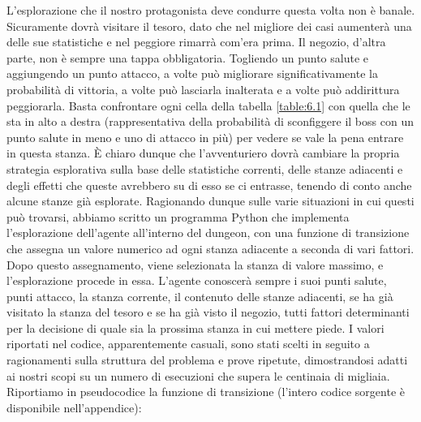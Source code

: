 \documentclass{book}
\theoremstyle{definition}
\theoremstyle{definition}
\theoremstyle{definition}
\theoremstyle{plain}
\theoremstyle{plain}
\theoremstyle{plain}
\theoremstyle{plain}
\begin{document}
L'esplorazione che il nostro protagonista deve condurre questa volta non è banale. Sicuramente dovrà visitare il tesoro, dato che nel migliore dei casi aumenterà una delle sue statistiche e nel peggiore rimarrà com'era prima. Il negozio, d'altra parte, non è sempre una tappa obbligatoria. Togliendo un punto salute e aggiungendo un punto attacco, a volte può migliorare significativamente la probabilità di vittoria, a volte può lasciarla inalterata e a volte può addirittura peggiorarla. Basta confrontare ogni cella della tabella \ref{table:6.1} con quella che le sta in alto a destra (rappresentativa della probabilità di sconfiggere il boss con un punto salute in meno e uno di attacco in più) per vedere se vale la pena entrare in questa stanza. È chiaro dunque che l'avventuriero dovrà cambiare la propria strategia esplorativa sulla base delle statistiche correnti, delle stanze adiacenti e degli effetti che queste avrebbero su di esso se ci entrasse, tenendo di conto anche alcune stanze già esplorate. Ragionando dunque sulle varie situazioni in cui questi può trovarsi, abbiamo scritto un programma Python che implementa l'esplorazione dell'agente all'interno del dungeon, con una funzione di transizione che assegna un valore numerico ad ogni stanza adiacente a seconda di vari fattori. Dopo questo assegnamento, viene selezionata la stanza di valore massimo, e l'esplorazione procede in essa. L'agente conoscerà sempre i suoi punti salute, punti attacco, la stanza corrente, il contenuto delle stanze adiacenti, se ha già visitato la stanza del tesoro e se ha già visto il negozio, tutti fattori determinanti per la decisione di quale sia la prossima stanza in cui mettere piede. I valori riportati nel codice, apparentemente casuali, sono stati scelti in seguito a ragionamenti sulla struttura del problema e prove ripetute, dimostrandosi adatti ai nostri scopi su un numero di esecuzioni che supera le centinaia di migliaia. Riportiamo in pseudocodice la funzione di transizione (l'intero codice sorgente è disponibile nell'appendice):
\end{document}
